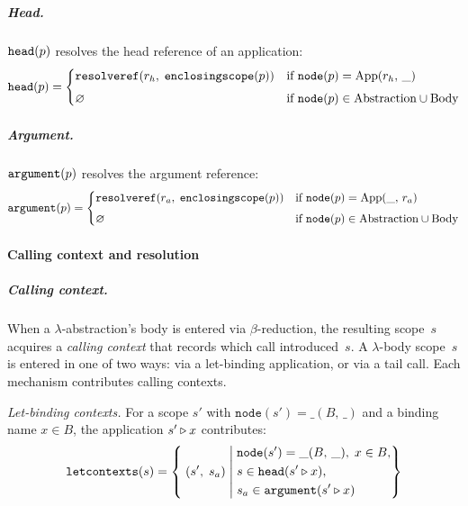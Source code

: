 \subparagraph{Head.}
$\mathtt{head}(p)$ resolves the head reference of an application:
\begin{equation}\label{eq:lambda-head}
  \mathtt{head}(p) =
  \begin{cases}
    \mathtt{resolveref}(r_h,\; \mathtt{enclosingscope}(p))
    & \text{if } \mathtt{node}(p) = \mathrm{App}(r_h,\, \_) \\[4pt]
    \varnothing
    & \text{if } \mathtt{node}(p) \in
    \mathrm{Abstraction} \cup \mathrm{Body}
  \end{cases}
\end{equation}

\subparagraph{Argument.}
$\mathtt{argument}(p)$ resolves the argument reference:
\begin{equation}\label{eq:lambda-argument}
  \mathtt{argument}(p) =
  \begin{cases}
    \mathtt{resolveref}(r_a,\; \mathtt{enclosingscope}(p))
    & \text{if } \mathtt{node}(p) = \mathrm{App}(\_,\, r_a) \\[4pt]
    \varnothing
    & \text{if } \mathtt{node}(p) \in
    \mathrm{Abstraction} \cup \mathrm{Body}
  \end{cases}
\end{equation}

\paragraph{Calling context and resolution}

\subparagraph{Calling context.}
When a $\lambda$-abstraction's body is entered via
$\beta$-reduction, the resulting scope~$s$ acquires a
\emph{calling context} that records which call
introduced~$s$.
A $\lambda$-body scope~$s$ is entered in one of two ways:
via a let-binding application, or via a tail call.
Each mechanism contributes calling contexts.

\emph{Let-binding contexts.}\;
For a scope $s'$ with $\mathtt{node}(s') = \_(B,\, \_)$
and a binding name $x \in B$, the application
$s' \mathbin{\triangleright} x$ contributes:
\begin{equation}\label{eq:lambda-let-contexts}
  \mathtt{letcontexts}(s) =
  \left\{\; (s',\; s_a) \;\middle|\;
    \begin{aligned}
      &\mathtt{node}(s') = \_(B,\, \_),\;
      x \in B,\\
      &s \in \mathtt{head}(s' \mathbin{\triangleright} x),\\
      &s_a \in \mathtt{argument}(s' \mathbin{\triangleright} x)
    \end{aligned}
  \right\}
\end{equation}

